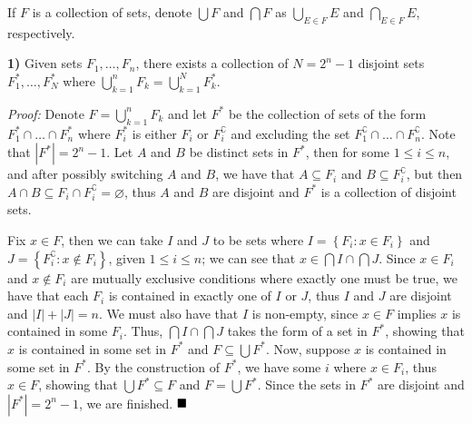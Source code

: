 \documentclass[12pt]{article}
\newcommand{\braceb}[1]{\left\{#1\right\}}
\newcommand{\vertb}[1]{\left\vert#1\right\vert}
\newcommand{\comp}{\complement}
\newcommand{\proof}{\textit{Proof: }}
\newcommand{\done}{\ensuremath{\strut\hfill\blacksquare}}
\begin{document}
\pagestyle{fancy}

\setlength{\parindent}{0in}
\setlength{\parskip}{0.1in}

If \( F \) is a collection of sets, denote \( \bigcup F \) and \( \bigcap F \)
as \( \bigcup_{E \in F} E \) and \( \bigcap_{E \in F} E \), respectively.

\textbf{1)}
Given sets \( F_1, \dots, F_n \), there exists a collection of
\( N = 2^n - 1 \) disjoint sets \( F^*_1, \dots, F^*_N \) where
\( \bigcup_{k = 1}^n F_k = \bigcup_{k = 1}^{N} F^*_k \).

\proof
Denote \( F = \bigcup_{k = 1}^n F_k \) and let \( F^* \) be the collection of
sets of the form \( F^*_1 \cap \dots \cap F^*_n \) where \( F^*_i \) is either
\( F_i \) or \( F_i^\comp \) and excluding the set
\( F_1^\comp \cap \dots \cap F_n^\comp \).
Note that \( \vertb{F^*} = 2^n - 1 \).
Let \( A \) and \( B \) be distinct sets in \( F^* \), then for some
\( 1 \leq i \leq n \), and after possibly switching \( A \) and \( B \), we
have that \( A \subseteq F_i \) and \( B \subseteq F_i^\comp \), but then
\( A \cap B \subseteq F_i \cap F_i^\comp = \varnothing \), thus \( A \) and
\( B \) are disjoint and \( F^* \) is a collection of disjoint sets.

Fix \( x \in F \), then we can take \( I \) and \( J \) to be sets where
\( I = \braceb{F_i : x \in F_i} \) and
\( J = \braceb{F_i^\comp : x \notin F_i} \), given \( 1 \leq i \leq n \);
we can see that \( x \in \bigcap I \cap \bigcap J \).
Since \( x \in F_i \) and \( x \notin F_i \) are mutually exclusive conditions
where exactly one must be true, we have that each \( F_i \) is contained in
exactly one of \( I \) or \( J \), thus \( I \) and \( J \) are disjoint and
\( \vertb{I} + \vertb{J} = n \).
We must also have that \( I \) is non-empty, since \( x \in F \) implies
\( x \) is contained in some \( F_i \).
Thus, \( \bigcap I \cap \bigcap J \) takes the form of a set in
\( F^* \), showing that \( x \) is contained in some set in \( F^* \) and
\( F \subseteq \bigcup F^* \).
Now, suppose \( x \) is contained in some set in \( F^* \).
By the construction of \( F^* \), we have some \( i \) where \( x \in F_i \),
thus \( x \in F \), showing that \( \bigcup F^* \subseteq F \) and
\( F = \bigcup F^* \).
Since the sets in \( F^* \) are disjoint and \( \vertb{F^*} = 2^n - 1 \), we
are finished.
\done
\end{document}
